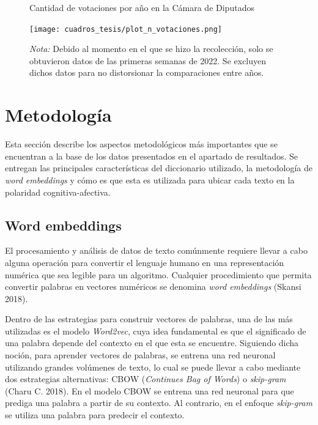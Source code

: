 \documentclass[
  12pt,
]{article}
\begin{document}
\begin{figure}[H]
\centering
\large
\caption{Cantidad de votaciones por año en la Cámara de Diputados}
\label{plot_n_votaciones}
\texttt{[image: cuadros\_tesis/plot\_n\_votaciones.png]}
  \caption*{\footnotesize{\textit{Nota:} Debido al momento en el que se hizo la recolección, solo se obtuvieron datos de las primeras semanas de 2022. Se excluyen dichos datos para no distorsionar la comparaciones entre años.}}
\normalsize
\end{figure}

\newpage

\hypertarget{metodologuxeda}{%
\section{Metodología}\label{metodologuxeda}}

Esta sección describe los aspectos metodológicos más importantes que se
encuentran a la base de los datos presentados en el apartado de
resultados. Se entregan las principales características del diccionario
utilizado, la metodología de \emph{word embeddings} y cómo es que esta
es utilizada para ubicar cada texto en la polaridad cognitiva-afectiva.

\hypertarget{word-embeddings}{%
\subsection{\texorpdfstring{Word embeddings
\label{word_emb}}{Word embeddings }}\label{word-embeddings}}

El procesamiento y análisis de datos de texto comúnmente requiere llevar
a cabo alguna operación para convertir el lenguaje humano en una
representación numérica que sea legible para un algoritmo. Cualquier
procedimiento que permita convertir palabras en vectores numéricos se
denomina \emph{word embeddings} (Skansi 2018).

Dentro de las estrategias para construir vectores de palabras, una de
las más utilizadas es el modelo \emph{Word2vec}, cuya idea fundamental
es que el significado de una palabra depende del contexto en el que esta
se encuentre. Siguiendo dicha noción, para aprender vectores de
palabras, se entrena una red neuronal utilizando grandes volúmenes de
texto, lo cual se puede llevar a cabo mediante dos estrategias
alternativas: CBOW (\emph{Continues Bag of Words}) o \emph{skip-gram}
(Charu C. 2018). En el modelo CBOW se entrena una red neuronal para que
prediga una palabra a partir de su contexto. Al contrario, en el enfoque
\emph{skip-gram} se utiliza una palabra para predecir el contexto.
\end{document}

